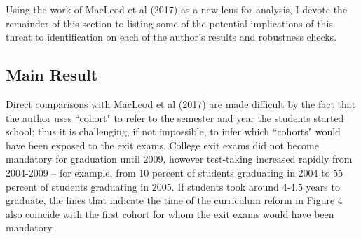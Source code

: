 \documentclass[a4paper, 11pt]{article}
\begin{document}
Using the work of MacLeod et al (2017) as a new lens for analysis, I devote the remainder of this section to listing some of the potential implications of this threat to identification on each of the author's results and robustness checks.

\subsection*{Main Result}

Direct comparisons with MacLeod et al (2017) are made difficult by the fact that the author uses ``cohort" to refer to the semester and year the students started school; thus it is challenging, if not impossible, to infer which ``cohorts" would have been exposed to the exit exams.  College exit exams did not become mandatory for graduation until 2009, however test-taking increased rapidly from 2004-2009 -- for example, from 10 percent of students graduating in 2004 to 55 percent of students graduating in 2005.  If students took around 4-4.5 years to graduate, the lines that indicate the time of the curriculum reform in Figure 4 also coincide with the first cohort for whom the exit exams would have been mandatory.  
\end{document}
